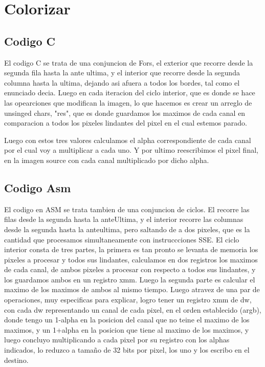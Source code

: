 \section{Colorizar}

\subsection{Codigo C}
	El codigo C se trata de una conjuncion de Fors, el exterior que recorre desde la segunda fila hasta la ante ultima,  y el interior que recorre desde la segunda columna hasta la ultima, dejando asi afuera a todos los bordes, tal como el enunciado decia. Luego en cada iteracion del ciclo interior, que es donde se hace las opearciones que modifican la imagen, lo que hacemos es crear un arreglo de unsinged chars, "res", que es  donde guardamos los maximos de cada canal en comparacion a todos  los pixeles lindantes del pixel en el cual estemos parado.
	\begin{itemize}
	\item {Res [0] $\leftarrow$ MaximoLindantesAzul
	\item {Res [1] $\leftarrow$ MaximoLindantesVerde}
	\item {Res [2] $\leftarrow$ MaximoLindantesRojo}
	\end{itemize}
Luego con estos tres valores calculamos el alpha correspondiente de cada canal por el cual voy a multiplicar a cada uno. Y por ultimo reescribimos el pixel final, en la imagen source con cada canal multiplicado  por dicho alpha.

\subsection{Codigo Asm}
	El codigo en ASM se trata tambien de una conjuncion de ciclos. El recorre las filas desde la segunda hasta la anteUltima, y el interior recorre las columnas desde la segunda hasta la anteultima, pero saltando de a dos pixeles, que es la cantidad que procesamos simultaneamente con instruccciones SSE. 
    El ciclo interior consta de tres partes, la primera es tan pronto se levanta de memoria los pixeles a procesar y todos sus lindantes, calculamos en dos registros los maximos de cada canal, de ambos pixeles a procesar con respecto a todos sus lindantes, y los guardamos ambos en un registro xmm. Luego la segunda parte es calcular el maximo de los maximos de ambos al mismo tiempo. Luego atravez de una par de operaciones, muy especificas para explicar, logro tener un registro xmm de dw, con cada dw representando un canal de cada pixel, en el orden establecido (argb), donde tengo un 1-alpha en la posicion del canal que no teine el maximo de los maximos, y un 1+alpha en la posicion que tiene al maximo de los maximos, y luego concluyo multiplicando a cada pixel por su registro con los alphas indicados, lo reduzco a tamaño de 32 bits por pixel, los uno y los escribo en el destino.
	

